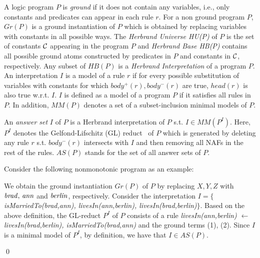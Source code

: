 A logic program $P$ is \textit{ground} if it does not contain any variables, i.e., only constants and predicates can appear in each rule $r$. For a non ground program $P$, $Gr(P)$ is a ground instantiation of $P$ which is obtained by replacing variables with constants in all possible ways. The \textit{Herbrand Universe HU(P)} of $P$ is the set of constants $\mathcal{C}$ appearing in the program $P$ and \textit{Herbrand Base HB(P)} contains all possible ground atoms constructed by predicates in $P$ and constants in $\mathcal{C}$, respectively. Any subset of $HB(P)$ is a \textit{Herbrand Interpretation} of a program $P$. An interpretation $I$ is a model of a rule $r$ if for every possible substitution of variables with constants for which $body^+(r), body^-(r)$ are true, $head(r)$ is also true w.r.t. $I$. $I$ is defined as a model of a program $P$ if it satisfies all rules in $P$. In addition, $MM(P)$ denotes a set of a subset-inclusion minimal models of $P$.

An \textit{answer set} $I$ of $P$ is a Herbrand interpretation of $P$ s.t. $I \in MM(P^I)$. Here, $P^I$ denotes the Gelfond-Lifschitz (GL) reduct~\cite{ref50} of $P$ which is generated by deleting any rule $r$ s.t. $body^-(r)$ intersects with $I$ and then removing all NAFs in the rest of the rules. $AS(P)$ stands for the set of all answer sets of $P$.

\begin{example}\label{ex:as}
Consider the following nonmonotonic program as an example:\\
{\small {}}

\normalsize
{\smallskip

\noindent            
We obtain the ground instantiation $Gr(P)$ of $P$ by replacing $X,Y,Z$ with $\mathit{brad, \,ann}$ and $\mathit{berlin}$, respectively. Consider the interpretation $I=\{${\small\textit{isMarriedTo(brad,ann), livesIn(ann,berlin), livesIn(brad,berlin)}}$\}$. Based on the above definition, the GL-reduct $P^I$ of $P$ consists of a rule \textit{livesIn(ann,berlin) $\leftarrow$ livesIn(brad,berlin), isMarriedTo(brad,ann)} and the ground terms (1), (2). Since $I$ is a minimal model of $P^I$, by definition, we have that $I \in AS(P)$.}\qed
\end{example}

